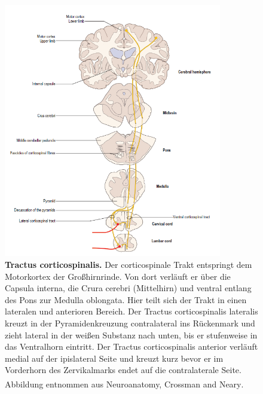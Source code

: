 \documentclass[12pt,a4paper,pdftex]{article}
\begin{document}
\begin{figure}[H]
    \centering
    \includegraphics[width=0.85\textwidth]{pictures/Bilder_Laura/corticospinal_tract.PNG}
    \caption[Tractus corticospinalis]{\textbf{Tractus corticospinalis.} Der corticospinale Trakt entspringt dem Motorkortex der Großhirnrinde. Von dort verläuft er über die Capsula interna, die Crura cerebri (Mittelhirn) und ventral entlang des Pons zur Medulla oblongata. Hier teilt sich der Trakt in einen lateralen und anterioren Bereich. Der Tractus corticospinalis lateralis kreuzt in der Pyramidenkreuzung contralateral ins Rückenmark und zieht lateral in der weißen Substanz nach unten, bis er stufenweise in das Ventralhorn eintritt. Der Tractus corticospinalis anterior verläuft medial auf der ipislateral Seite und kreuzt kurz bevor er im Vorderhorn des Zervikalmarks endet auf die contralaterale Seite. Abbildung entnommen aus Neuroanatomy, Crossman and Neary\textsuperscript{\cite[8]{crossman2014neuroanatomy}}.}
    \label{fig:tr_corticospinalis}
\end{figure}
\end{document}
